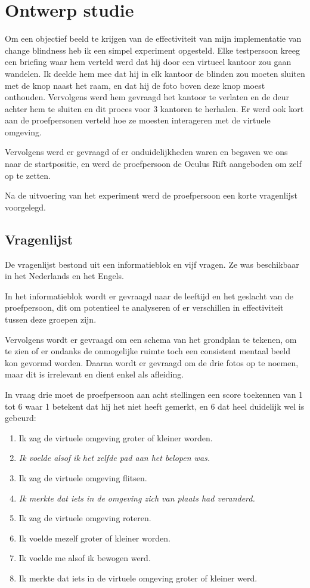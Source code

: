 \section{Ontwerp studie}
Om een objectief beeld te krijgen van de effectiviteit van mijn implementatie van
change blindness heb ik een simpel experiment opgesteld. Elke testpersoon kreeg
een briefing waar hem verteld werd dat hij door een virtueel kantoor zou gaan
wandelen. Ik deelde hem mee dat hij in elk kantoor de blinden zou moeten sluiten 
met de knop naast het raam, en dat hij de foto boven deze knop moest onthouden.
Vervolgens werd hem gevraagd het kantoor te verlaten en de deur achter hem te
sluiten en dit proces voor 3 kantoren te herhalen. Er werd ook kort aan de 
proefpersonen verteld hoe ze moesten interageren met de virtuele omgeving.

Vervolgens werd er gevraagd of er onduidelijkheden waren en begaven we ons naar 
de startpositie, en werd de proefpersoon de Oculus Rift aangeboden om zelf op te 
zetten.

Na de uitvoering van het experiment werd de proefpersoon een korte vragenlijst
voorgelegd.


\subsection{Vragenlijst}
De vragenlijst bestond uit een informatieblok en vijf vragen. Ze was beschikbaar
in het Nederlands en het Engels.

In het informatieblok wordt er gevraagd naar de leeftijd en het geslacht van de
proefpersoon, dit om potentieel te analyseren of er verschillen in effectiviteit
tussen deze groepen zijn.

Vervolgens wordt er gevraagd om een schema van het grondplan te tekenen, om te
zien of er ondanks de onmogelijke ruimte toch een consistent mentaal beeld kon
gevormd worden. Daarna wordt er gevraagd om de drie fotos op te noemen, maar 
dit is irrelevant en dient enkel als afleiding.

In vraag drie moet de proefpersoon aan acht stellingen een score toekennen van 1
tot 6 waar 1 betekent dat hij het niet heeft gemerkt, en 6 dat heel duidelijk wel 
is gebeurd:

\begin{enumerate}
  \item Ik zag de virtuele omgeving groter of kleiner worden.
  \item \emph{Ik voelde alsof ik het zelfde pad aan het belopen was.}
  \item Ik zag de virtuele omgeving flitsen.
  \item \emph{Ik merkte dat iets in de omgeving zich van plaats had veranderd.}
  \item Ik zag de virtuele omgeving roteren.
  \item Ik voelde mezelf groter of kleiner worden.
  \item Ik voelde me alsof ik bewogen werd.
  \item Ik merkte dat iets in de virtuele omgeving groter of kleiner werd.
\end{enumerate}

